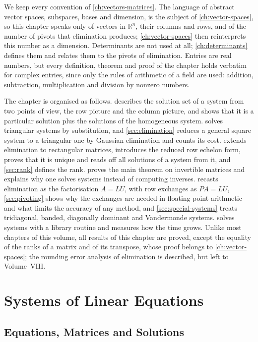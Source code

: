 We keep every convention of \cref{ch:vectors-matrices}. The language of abstract vector spaces, subspaces, bases and dimension, is the subject of \cref{ch:vector-spaces}, so this chapter speaks only of vectors in $\mathbb R^n$, their columns and rows, and of the number of pivots that elimination produces; \cref{ch:vector-spaces} then reinterprets this number as a dimension. Determinants are not used at all; \cref{ch:determinants} defines them and relates them to the pivots of elimination. Entries are real numbers, but every definition, theorem and proof of the chapter holds verbatim for complex entries, since only the rules of arithmetic of a field are used: addition, subtraction, multiplication and division by nonzero numbers.

The chapter is organised as follows.  describes the solution set of a system from two points of view, the row picture and the column picture, and shows that it is a particular solution plus the solutions of the homogeneous system.  solves triangular systems by substitution, and \cref{sec:elimination} reduces a general square system to a triangular one by Gaussian elimination and counts its cost.  extends elimination to rectangular matrices, introduces the reduced row echelon form, proves that it is unique and reads off all solutions of a system from it, and \cref{sec:rank} defines the rank.  proves the main theorem on invertible matrices and explains why one solves systems instead of computing inverses.  recasts elimination as the factorisation $A=LU$, with row exchanges as $PA=LU$, \cref{sec:pivoting} shows why the exchanges are needed in floating-point arithmetic and what limits the accuracy of any method, and \cref{sec:special-systems} treats tridiagonal, banded, diagonally dominant and Vandermonde systems.  solves systems with a library routine and measures how the time grows. Unlike most chapters of this volume, all results of this chapter are proved, except the equality of the ranks of a matrix and of its transpose, whose proof belongs to \cref{ch:vector-spaces}; the rounding error analysis of elimination is described, but left to Volume~VIII.

\section{Systems of Linear Equations}
\label{sec:systems}

\subsection{Equations, Matrices and Solutions}

